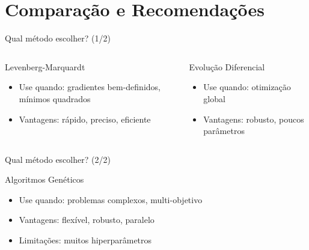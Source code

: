 \section{Comparação e Recomendações}

\begin{frame}{Qual método escolher? (1/2)}
\begin{columns}
\begin{block}{Levenberg-Marquardt}
\begin{itemize}
    \item Use quando: gradientes bem-definidos, mínimos quadrados
    \item Vantagens: rápido, preciso, eficiente
\end{itemize}
\end{block}

\begin{block}{Evolução Diferencial}
\begin{itemize}
    \item Use quando: otimização global
    \item Vantagens: robusto, poucos parâmetros
\end{itemize}
\end{block}
\end{columns}
\end{frame}

\begin{frame}{Qual método escolher? (2/2)}
\begin{block}{Algoritmos Genéticos}
\begin{itemize}
    \item Use quando: problemas complexos, multi-objetivo
    \item Vantagens: flexível, robusto, paralelo
    \item Limitações: muitos hiperparâmetros
\end{itemize}
\end{block}

\vspace{0.3cm}
\end{frame}

